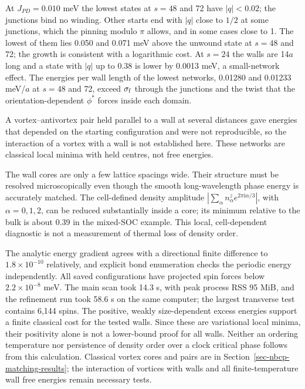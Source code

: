At \(J_{PD}=0.010\) meV the lowest states at \(s=48\) and 72 have
\(|q|<0.02\); the junctions bind no winding. Other starts end with
\(|q|\) close to \(1/2\) at some junctions, which the pinning modulo
\(\pi\) allows, and in some cases close to 1. The lowest of them lies
0.050 and 0.071 meV above the unwound state at \(s=48\) and 72; the growth is
consistent with a logarithmic cost. At \(s=24\) the walls are 14\(a\)
long and a state with \(|q|\) up to 0.38 is lower by 0.0013 meV, a
small-network effect. The energies per wall length of the lowest
networks, 0.01280 and 0.01233 meV/\(a\) at \(s=48\) and 72, exceed
\(\sigma_{\rm f}\) through the junctions and the twist that the
orientation-dependent \(\phi^*\) forces inside each domain.

A vortex--antivortex pair held parallel to a wall at several distances
gave energies that depended on the starting configuration and were not
reproducible, so the interaction of a vortex with a wall is not
established here. These networks are classical local minima with held
centres, not free energies.

The wall cores are only a few lattice spacings wide. Their structure
must be resolved microscopically even though the smooth long-wavelength
phase energy is accurately matched. The cell-defined density amplitude
\(|\sum_\alpha n^z_\alpha e^{2\pi\mathrm i\alpha/3}|\), with
\(\alpha=0,1,2\), can be reduced substantially inside a core; its
minimum relative to the bulk is about 0.39 in the mixed-SOC example.
This local, cell-dependent diagnostic is not a measurement of thermal
loss of density order.

The analytic energy gradient agrees with a directional finite difference
to \(1.8\times10^{-10}\) relatively, and explicit bond enumeration
checks the periodic energy independently. All saved configurations have
projected spin forces below \(2.2\times10^{-8}\) meV. The main scan took
14.3 s, with peak process RSS 95 MiB, and the refinement run took 58.6 s
on the same computer; the largest transverse test contains 6,144 spins.
The positive, weakly size-dependent excess energies support a finite
classical cost for the tested walls. Since these are variational local
minima, their positivity alone is not a lower-bound proof for all walls.
Neither an ordering temperature nor persistence of density order over a
clock critical phase follows from this calculation. Classical vortex
cores and pairs are in Section~\ref{sec-nbcp-matching-results}; the
interaction of vortices with walls and all finite-temperature wall free
energies remain necessary tests.

